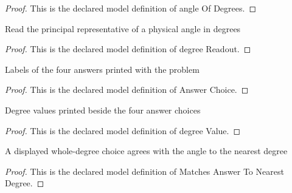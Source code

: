 \begin{proof}
  This is the declared model definition of angle Of Degrees.
\end{proof}
\begin{definition}
  \label{def:physics:phyx-mini-0220:phyxminiproblems-problemphyxmini0220-degreereadout}
  Read the principal representative of a physical angle in degrees
\end{definition}
\begin{proof}
  This is the declared model definition of degree Readout.
\end{proof}
\begin{definition}
  \label{def:physics:phyx-mini-0220:phyxminiproblems-problemphyxmini0220-answerchoice}
  Labels of the four answers printed with the problem
\end{definition}
\begin{proof}
  This is the declared model definition of Answer Choice.
\end{proof}
\begin{definition}
  \label{def:physics:phyx-mini-0220:phyxminiproblems-problemphyxmini0220-answerchoice-degreevalue}
  Degree values printed beside the four answer choices
\end{definition}
\begin{proof}
  This is the declared model definition of degree Value.
\end{proof}
\begin{definition}
  \label{def:physics:phyx-mini-0220:phyxminiproblems-problemphyxmini0220-matchesanswertonearestdegree}
  A displayed whole-degree choice agrees with the angle to the nearest degree
\end{definition}
\begin{proof}
  This is the declared model definition of Matches Answer To Nearest Degree.
\end{proof}
